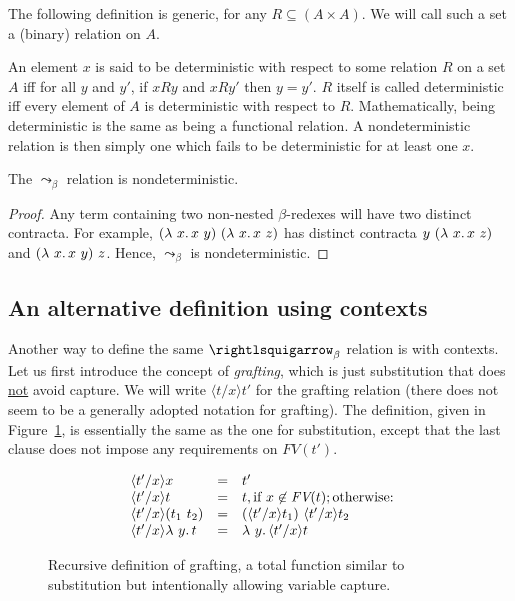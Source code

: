 \noindent The following definition is generic, for any $R\subseteq (A\times A)$.  We will call such
a set a (binary) relation on $A$.

\begin{definition}[determinism]
\label{def:det}
  An element $x$ is said to be deterministic with respect to some
  relation $R$ on a set $A$ iff for all $y$ and $y'$, if $x R y$ and
  $x R y'$ then $y = y'$.  $R$ itself is called deterministic iff
  every element of $A$ is deterministic with respect to $R$.
  Mathematically, being deterministic is the same as being a
  functional relation.  A nondeterministic relation is then simply one
  which fails to be deterministic for at least one
  $x$.
  \end{definition}

\begin{lemma}
  The $\leadsto_\beta$ relation is nondeterministic.
\end{lemma}
\begin{proof}
  Any term containing two non-nested $\beta$-redexes will have
  two distinct contracta.  For example, $(\lambda\ x.\, x\ y)\ (\lambda\ x.\, x\ z)$
  has distinct contracta $y\ (\lambda\ x.\, x\ z)$ and $(\lambda\ x.\, x\ y)\ z$.
  Hence, $\leadsto_\beta$ is nondeterministic.
\end{proof}

\subsection{An alternative definition using contexts}

Another way to define the same $\betar$ relation is with
contexts.  Let us first introduce the concept of \emph{grafting},
which is just substitution that does \underline{not} avoid
capture.  We will write $\langle t/x\rangle t'$ for
the grafting relation (there does not seem to be a generally adopted
notation for grafting).  The definition, given in
Figure~\ref{fig:grafting}, is essentially the same as the one for substitution,
except that the last clause does not impose
any requirements on $\textit{FV}(t')$.

\begin{figure}
\large
\[
  \begin{array}{lll}
\    \langle t'/x \rangle x & = & t' \\
\    \langle t'/x \rangle t & = & t, \textnormal{if }x\not\in\textit{FV}(t); \textnormal{otherwise:} \\
\    \langle t'/x \rangle(t_1\ t_2) & = & (\langle t'/x\rangle t_1)\ \langle t'/x\rangle t_2 \\
\    \langle t'/x\rangle\lambda\ y.\, t & = & \lambda\ y.\, \langle t'/x\rangle t
  \end{array}
\]
  \caption{Recursive definition of grafting, a total function similar to substitution but intentionally allowing variable capture.}
  \label{fig:grafting}
  \end{figure}

